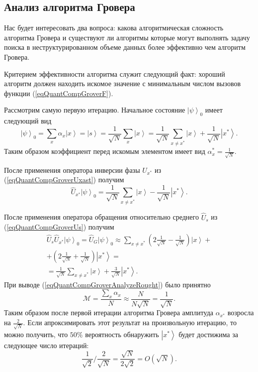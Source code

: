 \subsection{Анализ алгоритма Гровера}

Нас будет интересовать два вопроса: какова алгоритмическая сложность
алгоритма Гровера и существуют ли алгоритмы которые могут выполнять
задачу поиска в неструктурированном объеме данных более эффективно чем
алгоритм Гровера.

Критерием эффективности алгоритма служит следующий факт: хороший
алгоритм должен находить искомое значение с минимальным числом вызовов
функции (\ref{eqQuantCompGroverF}).

Рассмотрим самую первую итерацию. Начальное состояние
$\left|\psi\right>_0$ имеет следующий вид
\begin{equation}
\left|\psi\right>_0 =
\sum_x \alpha_x \left|x\right> =  
\left|s\right> = 
\frac{1}{\sqrt{N}}\sum_x \left|x\right> = 
\frac{1}{\sqrt{N}}\sum_{x\ne x^{\ast}} \left|x\right> +
\frac{1}{\sqrt{N}} \left|x^{\ast}\right>.
\nonumber
\end{equation}
Таким образом коэффициент перед искомым элементом имеет вид
$\alpha_x^{\ast} = \frac{1}{\sqrt{N}}$. 

После применения оператора инверсии
фазы $U_{x^{\ast}}$ из (\ref{eqQuantCompGroverUxast}) получим
\begin{equation}
\hat{U}_{x^{\ast}} \left|\psi\right>_0 =
\frac{1}{\sqrt{N}}\sum_{x\ne x^{\ast}} \left|x\right> - 
\frac{1}{\sqrt{N}} \left|x^{\ast}\right>.
\nonumber
\end{equation}

После применения оператора обращения относительно среднего $\hat{U}_s$ 
из (\ref{eqQuantCompGroverUs}) получим
\begin{eqnarray}
\hat{U}_s \hat{U}_{x^{\ast}} \left|\psi\right>_0 = 
\hat{U}_G \left|\psi\right>_0 \approx 
\sum_{x\ne x^{\ast}} \left( 2 \frac{1}{\sqrt{N}} - \frac{1}{\sqrt{N}}
\right) \left|x\right> + 
\nonumber \\
+ \left( 2 \frac{1}{\sqrt{N}} +
\frac{1}{\sqrt{N}} \right) \left|x^{\ast}\right> = 
\nonumber \\
= 
\frac{1}{\sqrt{N}}\sum_{x\ne x^{\ast}} \left|x\right> + 
\frac{3}{\sqrt{N}} \left|x^{\ast}\right>.
\label{eqQuantCompGroverAnalyzeRought}
\end{eqnarray}
При выводе (\ref{eqQuantCompGroverAnalyzeRought}) было принятно 
\[
\mathcal{M} = \frac{\sum_x \alpha_x}{N} \approx
\frac{N}{N \sqrt{N}} = \frac{1}{\sqrt{N}}.
\]
Таким образом после первой итерации алгоритма Гровера амплитуда
$\alpha_{x^{\ast}}$ возросла на $\frac{2}{\sqrt{N}}$. Если
апроксимировать этот результат на произвольную итерацию, то можно
получить, что $50\%$ вероятность обнаружить $\left|x^{\ast}\right>$
будет достижима за следующее число итераций:
\[
\frac{1}{\sqrt{2}}/\frac{2}{\sqrt{N}} =
\frac{\sqrt{N}}{2 \sqrt{2}} = O\left(\sqrt{N}\right).
\]

